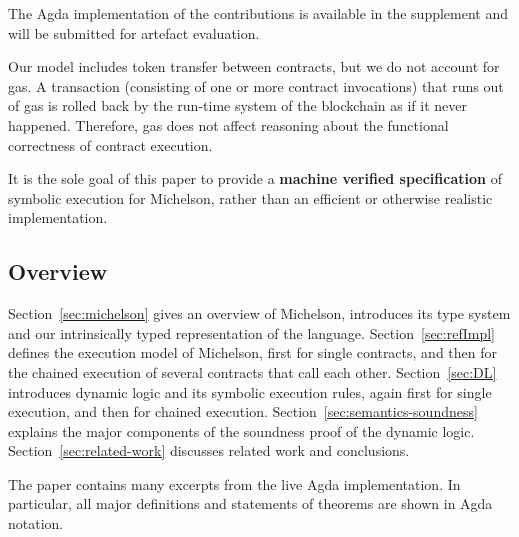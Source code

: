 The Agda implementation of the contributions is available in the
supplement and will be submitted for artefact evaluation.

Our model includes token transfer between contracts, but we do not account for gas.
A transaction (consisting of one or more contract invocations) that
runs out of gas is rolled back by the run-time system of the
blockchain as if it never happened. Therefore, gas does not affect
reasoning about the functional correctness of contract execution.

It is the sole goal of this paper to provide a \textbf{machine
  verified specification} of symbolic execution for Michelson, rather than an
efficient or otherwise realistic implementation. 

\subsection*{Overview}
\label{sec:overview}

Section~\ref{sec:michelson} gives an overview of Michelson, introduces
its type system and our intrinsically typed representation of the language.
Section~\ref{sec:refImpl} defines the execution model of Michelson,
first for single contracts, and then for the chained execution of
several contracts that call each other.
Section~\ref{sec:DL} introduces dynamic logic and its
symbolic execution rules, again first for single execution, and then
for chained execution.
Section~\ref{sec:semantics-soundness} explains the major components of
the soundness proof of the dynamic logic.
Section~\ref{sec:related-work} discusses related work and conclusions.

The paper contains many excerpts from the live Agda implementation. In
particular, all major definitions and statements of theorems are shown
in Agda notation.


